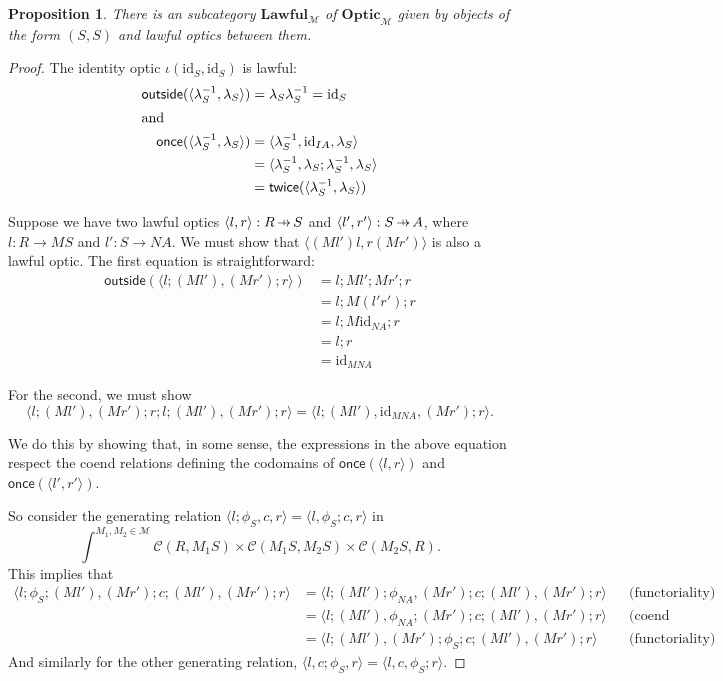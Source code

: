 \documentclass[11pt,a4paper]{article}
\theoremstyle{plain}
\newtheorem{proposition}[theorem]{Proposition}
\theoremstyle{definition}
\newcommand{\C}{\mathscr{C}}
\newcommand{\M}{\mathscr{M}}
\newcommand{\Optic}{\mathbf{Optic}}
\newcommand{\Lawful}{\mathbf{Lawful}}
\newcommand{\id}{\mathrm{id}}
\newcommand{\outside}{\mathsf{outside}}
\newcommand{\once}{\mathsf{once}}
\newcommand{\twice}{\mathsf{twice}}
\newcommand{\hto}{\ensuremath{\,\mathaccent\shortmid\rightarrow\,}}
\begin{document}
\begin{proposition}
  There is an subcategory $\Lawful_\M$ of $\Optic_\M$ given by objects of the form $(S, S)$ and lawful optics between them.
\end{proposition}
\begin{proof}
  The identity optic $\iota(\id_S, \id_S)$ is lawful:
  \begin{align*}
    \outside(\langle \lambda^{-1}_S, \lambda_{S} \rangle) &= \lambda_{S} \lambda^{-1}_S = \id_S \\
    \intertext{and}
    \once(\langle \lambda^{-1}_S, \lambda_{S} \rangle)
                                                          &= \langle \lambda^{-1}_S, \id_{IA}, \lambda_{S} \rangle \\
                                                          &= \langle \lambda^{-1}_S, \lambda_{S};\lambda^{-1}_S , \lambda_{S} \rangle \\
                                                          &= \twice(\langle \lambda^{-1}_S, \lambda_{S} \rangle)
  \end{align*}

  Suppose we have two lawful optics $\langle l, r \rangle : R \hto S$ and $\langle l', r' \rangle : S \hto A$, where $l : R \to MS$ and $l' : S \to NA$. We must show that $\langle (Ml')l, r (Mr')  \rangle$ is also a lawful optic. The first equation is straightforward:
  \begin{align*}
    \outside(\langle l; (Ml'),(Mr') ; r   \rangle)
    &= l ; Ml' ; Mr' ; r \\
    &= l ; M(l'r') ; r \\
    &= l ; M\id_{NA} ; r \\
    &= l ; r \\
    &= \id_{MNA}
  \end{align*}

  For the second, we must show
  \[ \langle l;(Ml'), (Mr'); r;l;(Ml') , (Mr') ; r  \rangle = \langle l;(Ml'), \id_{MNA} , (Mr') ; r  \rangle. \]

  We do this by showing that, in some sense, the expressions in the above equation respect the coend relations defining the codomains of $\once(\langle l, r \rangle)$ and $\once(\langle l', r' \rangle)$.

  So consider the generating relation $\langle l;\phi_S, c, r \rangle = \langle l, \phi_S ; c, r \rangle$ in \[\int^{M_1, M_2 \in \M} \C(R, M_1 S) \times \C(M_1 S, M_2 S) \times \C(M_2 S, R).\]
  This implies that
  \begin{align*}
    \langle l;\phi_S;(Ml'), (Mr'); c ;(Ml') , (Mr') ; r \rangle
    &= \langle l;(Ml');\phi_{NA}, (Mr'); c ;(Ml') , (Mr') ; r \rangle && \text{(functoriality)} \\
    &= \langle l;(Ml'), \phi_{NA};(Mr'); c ;(Ml') , (Mr') ; r \rangle && \text{(coend relation)} \\
    &= \langle l;(Ml'), (Mr');\phi_{S}; c ;(Ml') , (Mr') ; r \rangle && \text{(functoriality)}
  \end{align*}
  And similarly for the other generating relation, $\langle l, c;\phi_S, r \rangle = \langle l,  c, \phi_S; r \rangle$.


\end{proof}
\end{document}
